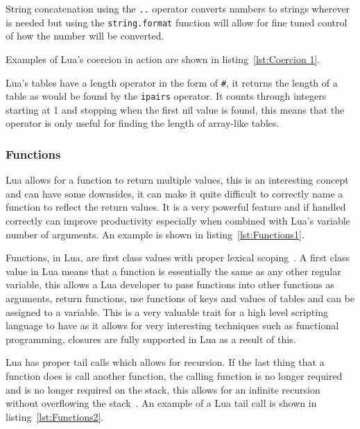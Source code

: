 \documentclass[11pt,a4paper,titlepage]{article}
\begin{document}
			String concatenation using the \texttt{..} operator converts numbers to strings wherever is needed but using the \texttt{string.format} function will allow for fine tuned control of how the number will be converted.

			Examples of Lua's coercion in action are shown in listing~\ref{lst:Coercion 1}.
			

			Lua's tables have a length operator in the form of \texttt{\#}, it returns the length of a table as would be found by the \texttt{ipairs} operator. It counts through integers starting at 1 and stopping when the first nil value is found, this means that the operator is only useful for finding the length of array-like tables.

		\subsubsection{Functions}
			Lua allows for a function to return multiple values, this is an interesting concept and can have some downsides, it can make it quite difficult to correctly name a function to reflect the return values. It is a very powerful feature and if handled correctly can improve productivity especially when combined with Lua's variable number of arguments. An example is shown in listing~\ref{lst:Functions1}.
			

			Functions, in Lua, are first class values with proper lexical scoping~\cite{Ierusalimschy:2013:PLT:2502646}. A first class value in Lua means that a function is essentially the same as any other regular variable, this allows a Lua developer to pass functions into other functions as arguments, return functions, use functions of keys and values of tables and can be assigned to a variable. This is a very valuable trait for a high level scripting language to have as it allows for very interesting techniques such as functional programming, closures are fully supported in Lua as a result of this.

			Lua has proper tail calls which allows for recursion. If the last thing that a function does is call another function, the calling function is no longer required and is no longer required on the stack, this allows for an infinite recursion without overflowing the stack~\cite{Ierusalimschy:2013:PLT:2502646}. An example of a Lua tail call is shown in listing~\ref{lst:Functions2}.
			
\end{document}
